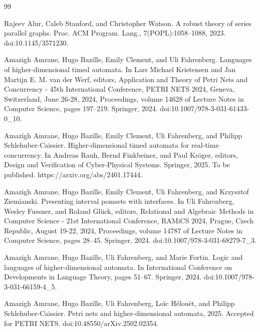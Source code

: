 \begin{thebibliography}{99}
\par\noindent    Rajeev Alur, Caleb Stanford, and Christopher Watson.  A robust theory of series parallel graphs.  Proc. ACM Program. Lang., 7(POPL):1058–1088, 2023.  doi:10.1145/3571230.  

\par\noindent    Amazigh Amrane, Hugo Bazille, Emily Clement, and Uli Fahrenberg.  Languages of higher-dimensional timed automata.  In Lars Michael Kristensen and Jan Martijn E. M. van der Werf, editors, Application and Theory of Petri Nets and Concurrency - 45th International Conference, PETRI NETS 2024, Geneva, Switzerland, June 26-28, 2024, Proceedings, volume 14628 of Lecture Notes in Computer Science, pages 197–219. Springer, 2024.  doi:10.1007/978-3-031-61433-0\_10.  

\par\noindent    Amazigh Amrane, Hugo Bazille, Emily Clement, Uli Fahrenberg, and Philipp Schlehuber-Caissier.  Higher-dimensional timed automata for real-time concurrency.  In Andreas Rauh, Bernd Finkbeiner, and Paul Kröger, editors, Design and Verification of Cyber-Physical Systems. Springer, 2025.  To be published. https://arxiv.org/abs/2401.17444.  

\par\noindent    Amazigh Amrane, Hugo Bazille, Emily Clement, Uli Fahrenberg, and Krzysztof Ziemianski.  Presenting interval pomsets with interfaces.  In Uli Fahrenberg, Wesley Fussner, and Roland Glück, editors, Relational and Algebraic Methods in Computer Science - 21st International Conference, RAMiCS 2024, Prague, Czech Republic, August 19-22, 2024, Proceedings, volume 14787 of Lecture Notes in Computer Science, pages 28–45. Springer, 2024.  doi:10.1007/978-3-031-68279-7\_3.  

\par\noindent    Amazigh Amrane, Hugo Bazille, Uli Fahrenberg, and Marie Fortin.  Logic and languages of higher-dimensional automata.  In International Conference on Developments in Language Theory, pages 51–67. Springer, 2024.  doi:10.1007/978-3-031-66159-4\_5.  

\par\noindent    Amazigh Amrane, Hugo Bazille, Uli Fahrenberg, Loïc Hélouët, and Philipp Schlehuber-Caissier.  Petri nets and higher-dimensional automata, 2025.  Accepted for PETRI NETS.  doi:10.48550/arXiv.2502.02354.  


\end{thebibliography}

